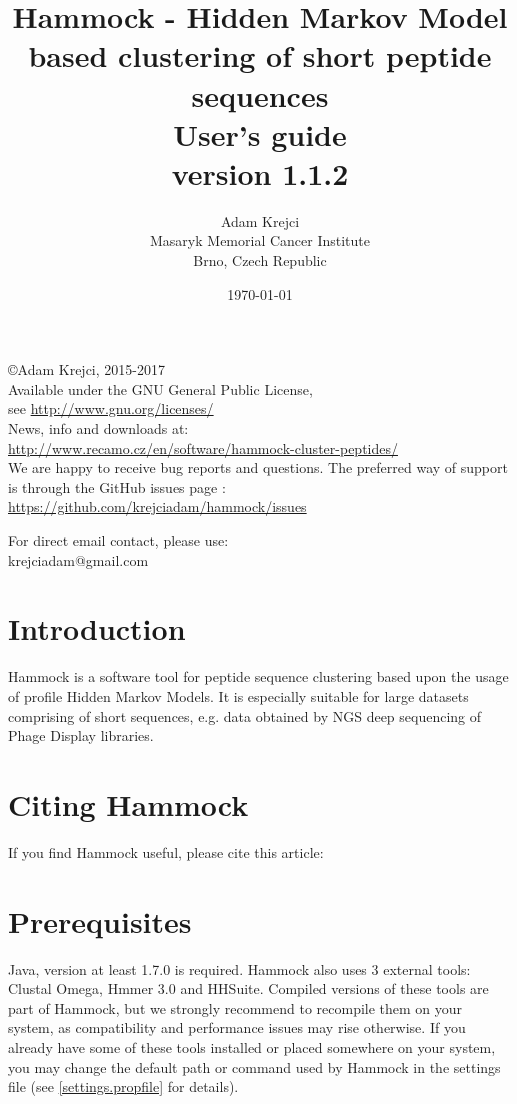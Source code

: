 \documentclass[11pt, a4paper, twoside, titlepage]{article}
\title{Hammock - Hidden Markov Model based clustering of short peptide sequences\\ \vspace{2 mm} {\large User's guide} \\ \vspace{2 mm} {\small version 1.1.2}}
\author{Adam Krejci  \\
	Masaryk Memorial Cancer Institute\\
	Brno, Czech Republic
	}
\date{\today}
\begin{document}
\maketitle

\begin{center}
\copyright Adam Krejci, 2015-2017 \\ \vspace{1cm}
Available under the GNU General Public License, \\
see \url{http://www.gnu.org/licenses/} \\ \vspace{1cm}
News, info and downloads at: \\
\url{http://www.recamo.cz/en/software/hammock-cluster-peptides/} \\ \vspace{1cm}
We are happy to receive bug reports and questions. The preferred way of support is through the GitHub issues page : \\
 \url{https://github.com/krejciadam/hammock/issues}

 For direct email contact, please use: \\
krejciadam@gmail.com
\end{center} 
\newpage



\tableofcontents

\newpage

\section{Introduction}
\label{introduction}
Hammock is a software tool for peptide sequence clustering based upon the usage of profile Hidden Markov Models. It is especially suitable for large datasets comprising of short sequences, e.g. data obtained by NGS deep sequencing of Phage Display libraries.


\section{Citing Hammock}
If you find Hammock useful, please cite this article: \newline




\section{Prerequisites}
\label{prerequisities}
Java, version at least 1.7.0 is required. Hammock also uses 3 external tools: Clustal Omega\cite{Sievers2011}, Hmmer 3.0\citep{Finn2011} and HHSuite\citep{Soding2004}. Compiled versions of these tools are part of Hammock, but we strongly recommend to recompile them on your system, as compatibility and performance issues may rise otherwise. If you already have some of these tools installed or placed somewhere on your system, you may change the default path or command used by Hammock in the settings file (see \ref{settings.propfile} for details). 
\end{document}
